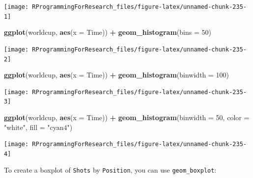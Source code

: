 \documentclass[]{book}
\makeatletter
\newenvironment{Shaded}{\begin{snugshade}}{\end{snugshade}}
\newcommand{\KeywordTok}[1]{\textcolor[rgb]{0.13,0.29,0.53}{\textbf{#1}}}
\newcommand{\DataTypeTok}[1]{\textcolor[rgb]{0.13,0.29,0.53}{#1}}
\newcommand{\DecValTok}[1]{\textcolor[rgb]{0.00,0.00,0.81}{#1}}
\newcommand{\StringTok}[1]{\textcolor[rgb]{0.31,0.60,0.02}{#1}}
\newcommand{\OperatorTok}[1]{\textcolor[rgb]{0.81,0.36,0.00}{\textbf{#1}}}
\newcommand{\NormalTok}[1]{#1}
\newenvironment{kframe}{%
\medskip{}
\setlength{\fboxsep}{.8em}
 \def\at@end@of@kframe{}%
 \ifinner\ifhmode%
  \def\at@end@of@kframe{\end{minipage}}%
  \begin{minipage}{\columnwidth}%
 \fi\fi%
 \def\FrameCommand##1{\hskip\@totalleftmargin \hskip-\fboxsep
 \colorbox{shadecolor}{##1}\hskip-\fboxsep
     \hskip-\linewidth \hskip-\@totalleftmargin \hskip\columnwidth}%
 \MakeFramed {\advance\hsize-\width
   \@totalleftmargin\z@ \linewidth\hsize
   \@setminipage}}%
 {\par\unskip\endMakeFramed%
 \at@end@of@kframe}
\renewenvironment{Shaded}{\begin{kframe}}{\end{kframe}}
\theoremstyle{definition}
\theoremstyle{definition}
\theoremstyle{definition}
\theoremstyle{remark}
\makeatother
\begin{document}
\begin{center}\texttt{[image: RProgrammingForResearch\_files/figure-latex/unnamed-chunk-235-1]} \end{center}

\begin{Shaded}
\begin{Highlighting}[]
\KeywordTok{ggplot}\NormalTok{(worldcup, }\KeywordTok{aes}\NormalTok{(}\DataTypeTok{x =}\NormalTok{ Time)) }\OperatorTok{+}\StringTok{ }
\StringTok{  }\KeywordTok{geom_histogram}\NormalTok{(}\DataTypeTok{bins =} \DecValTok{50}\NormalTok{)}
\end{Highlighting}
\end{Shaded}

\begin{center}\texttt{[image: RProgrammingForResearch\_files/figure-latex/unnamed-chunk-235-2]} \end{center}

\begin{Shaded}
\begin{Highlighting}[]
\KeywordTok{ggplot}\NormalTok{(worldcup, }\KeywordTok{aes}\NormalTok{(}\DataTypeTok{x =}\NormalTok{ Time)) }\OperatorTok{+}\StringTok{ }
\StringTok{  }\KeywordTok{geom_histogram}\NormalTok{(}\DataTypeTok{binwidth =} \DecValTok{100}\NormalTok{)}
\end{Highlighting}
\end{Shaded}

\begin{center}\texttt{[image: RProgrammingForResearch\_files/figure-latex/unnamed-chunk-235-3]} \end{center}

\begin{Shaded}
\begin{Highlighting}[]
\KeywordTok{ggplot}\NormalTok{(worldcup, }\KeywordTok{aes}\NormalTok{(}\DataTypeTok{x =}\NormalTok{ Time)) }\OperatorTok{+}\StringTok{ }
\StringTok{  }\KeywordTok{geom_histogram}\NormalTok{(}\DataTypeTok{binwidth =} \DecValTok{50}\NormalTok{, }\DataTypeTok{color =} \StringTok{"white"}\NormalTok{, }\DataTypeTok{fill =} \StringTok{"cyan4"}\NormalTok{)}
\end{Highlighting}
\end{Shaded}

\begin{center}\texttt{[image: RProgrammingForResearch\_files/figure-latex/unnamed-chunk-235-4]} \end{center}

To create a boxplot of \texttt{Shots} by \texttt{Position}, you can use
\texttt{geom\_boxplot}:
\end{document}
